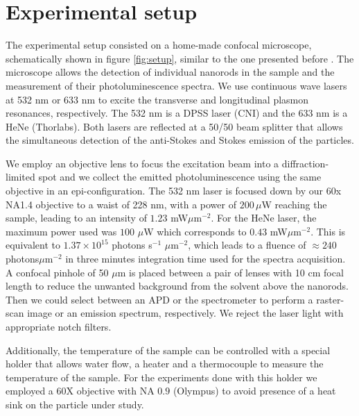 \documentclass[journal=nalefd,manuscript=letter]{achemso}
\begin{document}
\pagebreak

\section{Experimental setup}\label{sec:setup}

The experimental setup consisted on a home-made confocal microscope, schematically shown in figure
\ref{fig:setup}, similar to the one presented before \cite{Carattino2016a}. The microscope allows 
the detection of individual nanorods in the sample and the measurement of their photoluminescence spectra. 
We use continuous wave lasers at 532 nm or 633 nm to excite the transverse and longitudinal plasmon resonances, respectively. The  532 nm is a DPSS laser (CNI) and the 633 nm is a HeNe (Thorlabs). Both lasers are reflected at a 50/50 beam splitter that allows the simultaneous detection of the anti-Stokes and Stokes emission of the particles.

We employ an objective lens to focus the excitation beam into a diffraction-limited 
spot and we collect the emitted photoluminescence using the same objective in an epi-configuration. 
The 532 nm laser is focused down by our 60x NA1.4 objective to a waist of 228 nm, with a power of $200\, \mu$W reaching the sample, leading to an intensity of $1.23$ mW$\mu$m$^{-2}$. 
For the HeNe laser, the maximum power used was $100$ $\mu$W which 
corresponds to $0.43$ mW$\mu$m$^{-2}$. This is equivalent to $1.37\times10^{15}$ photons s$^{-1}$ $\mu$m$^{-2}$, which leads to a fluence of $\approx 240$ photons$\mu$m$^{-2}$ in three minutes integration time used for the spectra acquisition. 
A confocal pinhole of 50 $\mu$m is placed between a pair of lenses with 10 cm focal length to reduce the unwanted background from the solvent above the nanorods. Then we could select between an APD or the spectrometer to perform a raster-scan image or an emission spectrum, respectively. We reject the laser light with appropriate notch filters.

Additionally, the temperature of the sample can be controlled with a special holder that allows 
water flow, a heater and a thermocouple to measure the temperature of the sample. For the experiments
done with this holder we employed a 60X objective with NA $0.9$ (Olympus) to avoid presence of a heat sink on the 
particle under study.
\end{document}
